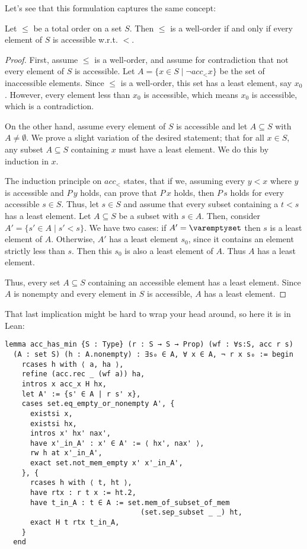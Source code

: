 \documentclass[a4paper, 12pt]{article}
\theoremstyle{changedot}
\theoremstyle{changedotbreak}
\theoremstyle{nonumberplain}
\newtheorem{proof}{Proof}
\begin{document}
Let's see that this formulation captures the same concept:

\begin{theorem}
  Let $\leq$ be a total order on a set $S$. Then $\leq$ is a well-order if and only if every element of $S$ is accessible w.r.t. $<$.
\end{theorem}
\begin{proof}
  First, assume $\leq$ is a well-order, and assume for contradiction that not every element of $S$ is accessible. Let $A = \{x \in S \mid \neg acc_{<} x\}$ be the set of inaccessible elements. Since $\leq$ is a well-order, this set has a least element, say $x_{0}$. However, every element less than $x_{0}$ is accessible, which means $x_{0}$ is accessible, which is a contradiction.

  On the other hand, assume every element of $S$ is accessible and let $A \subseteq S$ with $A \neq \emptyset$. We prove a slight variation of the desired statement; that for all $x \in S$, any subset $A \subseteq S$ containing $x$ must have a least element. We do this by induction in $x$.

  The induction principle on $acc_{<}$ states, that if we, assuming every $y < x$ where $y$ is accessible and $P\, y$ holds, can prove that $P\, x$ holds, then $P\, s$ holds for every accessible $s \in S$. Thus, let $s \in S$ and assume that every subset containing a $t < s$ has a least element. Let $A \subseteq S$ be a subset with $s \in A$. Then, consider $A' = \{s' \in A \mid s' < s\}$. We have two cases: if $A' = \varemptyset$ then $s$ is a least element of $A$. Otherwise, $A'$ has a least element $s_{0}$, since it contains an element strictly less than $s$. Then this $s_{0}$ is also a least element of $A$. Thus $A$ has a least element.

  Thus, every set $A \subseteq S$ containing an accessible element has a least element. Since $A$ is nonempty and every element in $S$ is accessible, $A$ has a least element.
\end{proof}

That last implication might be hard to wrap your head around, so here it is in Lean:

\begin{verbatim}
lemma acc_has_min {S : Type} (r : S → S → Prop) (wf : ∀s:S, acc r s)
  (A : set S) (h : A.nonempty) : ∃s₀ ∈ A, ∀ x ∈ A, ¬ r x s₀ := begin
    rcases h with ⟨ a, ha ⟩,
    refine (acc.rec _ (wf a)) ha,
    intros x acc_x H hx,
    let A' := {s' ∈ A | r s' x},
    cases set.eq_empty_or_nonempty A', {
      existsi x,
      existsi hx,
      intros x' hx' nax',
      have x'_in_A' : x' ∈ A' := ⟨ hx', nax' ⟩,
      rw h at x'_in_A',
      exact set.not_mem_empty x' x'_in_A',
    }, {
      rcases h with ⟨ t, ht ⟩,
      have rtx : r t x := ht.2,
      have t_in_A : t ∈ A := set.mem_of_subset_of_mem
                                (set.sep_subset _ _) ht,
      exact H t rtx t_in_A,
    }
  end
\end{verbatim}
\end{document}
